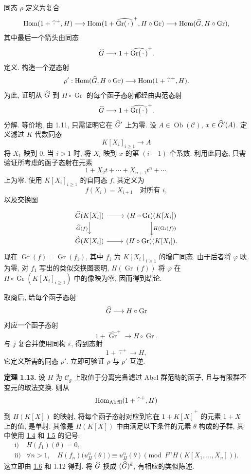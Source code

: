 同态 \(\rho\) 定义为复合
\[
 \operatorname{Hom}(1+\widehat{\,\cdot\,}^{+},H)
 \longrightarrow
 \operatorname{Hom}(1+\widehat{\operatorname{Gr}(\,\cdot\,)}^{+},H\circ\operatorname{Gr})
 \longrightarrow
 \operatorname{Hom}(\widehat G,H\circ\operatorname{Gr}),
\]
其中最后一个箭头由同态
\[
  \widehat G\longrightarrow 1+\widehat{\operatorname{Gr}(\,\cdot\,)}^{+}.
\]
定义. 构造一个逆态射
\[
  \rho':\operatorname{Hom}(\widehat G,H\circ\operatorname{Gr})
  \longrightarrow
  \operatorname{Hom}(1+\widehat{\,\cdot\,}^{+},H).
\]
为此, 证明从 \(\widehat G\) 到 \(H\circ\operatorname{Gr}\) 的每个函子态射都经由典范态射
\[
  \widehat G\longrightarrow 1+\widehat{\operatorname{Gr}(\,\cdot\,)}^{+}.
\]
分解. 等价地, 由 1.11, 只需证明它在 \(\widehat G'\) 上为零. 设 \(A\in\operatorname{Ob}(\mathcal C)\), \(x\in\widehat G'(A)\). 定义滤过 \(K\)-代数同态
\[
  K[X_i]_{i\geq 1}\longrightarrow A
\]
将 \(X_1\) 映到 \(0\), 当 \(i>1\) 时, 将 \(X_i\) 映到 \(x\) 的第 \((i-1)\) 个系数. 利用此同态, 只需验证所考虑的函子态射在元素
\[
  1+X_2t+\cdots+X_{n+1}t^n+\cdots .
\]
上为零. 使用 \(K[X_i]_{i\geq 1}\) 的自同态 \(f\), 其定义为
\[
  f(X_i)=X_{i+1}\quad\text{对所有 }i,
\]
以及交换图
\[
\begin{tikzcd}
\Ghat(K[X_i]) \arrow[r] \arrow[d,"\Ghat(f)"'] &
(H\circ\operatorname{Gr})(K[X_i]) \arrow[d,"H(\operatorname{Gr}(f))"]\\
\Ghat(K[X_i]) \arrow[r] &
(H\circ\operatorname{Gr})(K[X_i]).
\end{tikzcd}
\]
现在 \(\operatorname{Gr}(f)=\operatorname{Gr}(f_1)\), 其中 \(f_1\) 为 \(K[X_i]_{i\geq 1}\) 的增广同态. 由于后者将 \(\varphi\) 映为零, 对 \(f_1\) 写出的类似交换图表明, \(H(\operatorname{Gr}(f))\) 将 \(\varphi\) 在 \(H\circ\operatorname{Gr}(K[X_i]_{i\geq 1})\) 中的像映为零, 因而得到结论.

取商后, 给每个函子态射
\[
  \widehat G\longrightarrow H\circ\operatorname{Gr}
\]
对应一个函子态射
\[
  1+\widehat{\operatorname{Gr}}^{+}\longrightarrow H\circ\operatorname{Gr}.
\]
与 \(j\) 复合并使用同构 \(\varepsilon\), 得到态射
\[
  1+\widehat{\,\cdot\,}^{+}\longrightarrow H,
\]
它定义所需的同态 \(\rho'\). 立即可验证 \(\rho\) 与 \(\rho'\) 互逆.

\textbf{定理 1.13.} 设 \(H\) 为 \(\mathcal C_g\) 上取值于分离完备滤过 Abel 群范畴的函子, 且与有限群不变元的取法交换. 则从
\[
  \operatorname{Hom}_{\mathrm{Ab\,fil}}(1+\widehat{\,\cdot\,}^{+},H)
\]
到 \(H(K[X])\) 的映射, 将每个函子态射对应到它在 \(1+\widehat{K[X]}^{+}\) 的元素 \(1+X\) 上的值, 是单射. 其像是 \(H(K[X])\) 中由满足以下条件的元素 \(\theta\) 构成的子群, 其中使用 \hyperlink{sga6.e05.para.1-4}{1.4} 和 \hyperlink{sga6.e05.para.1-5}{1.5} 的记号:
\[
\begin{array}{ll}
\text{i)}&H(f_1)(\theta)=0,\\[0.3em]
\text{ii)}&\forall n>1,\quad
H(f_n)\bigl(u_H^n(\theta)\bigr)\equiv u_H^n(\theta)
 \pmod{F^nH(K[X_1,\ldots,X_n])}.
\end{array}
\]
这立即由 \hyperlink{sga6.e05.thm.1-6}{1.6} 和 1.12 得到. 将 \(\widehat G\) 换成 \((\widehat G)^k\), 有相应的类似陈述.

